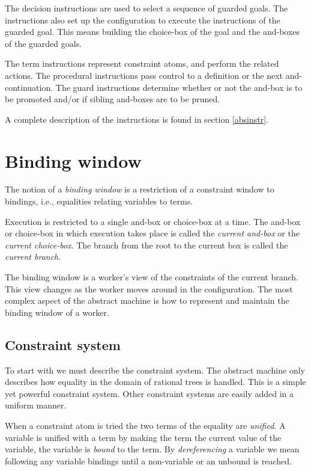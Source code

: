 The decision instructions are used to select a sequence of guarded
goals. The instructions also set up the configuration to execute
the instructions of the guarded goal. This means building the
choice-box of the goal and the and-boxes of the guarded goals.

The term instructions represent constraint atoms, and perform the
related actions.  The procedural instructions pass control to a
definition or the next and-continuation.  The guard instructions
determine whether or not the and-box is to be promoted and/or if
sibling and-boxes are to be pruned.

A complete description of the instructions is found in section
\ref{absinstr}.

\section{Binding window}

The notion of a {\em binding window} is a restriction of a constraint
window to bindings, i.e., equalities relating variables to terms.

Execution is restricted to a single and-box or choice-box at a time.
The and-box or choice-box in which execution takes place is called the
{\em current and-box} or the {\em current choice-box}. The branch from
the root to the current box is called the {\em current branch}. 

The binding window is a worker's view of the constraints of the current
branch. This view changes as the worker moves around in the
configuration. The most complex aspect of the abstract machine is how to
represent and maintain the binding window of a worker.

\subsection*{Constraint system}

To start with we must describe the constraint system.  The abstract
machine only describes how equality in the domain of rational
trees is handled. This is a simple yet powerful constraint
system. Other constraint systems are easily added in a uniform manner.

When a constraint atom is tried the two terms of the equality are {\em
unified}. A variable is unified with a term by making the term the
current value of the variable, the variable is {\em bound} to the
term.  By {\em dereferencing} a variable we mean following any
variable bindings until a non-variable or an unbound is reached.


